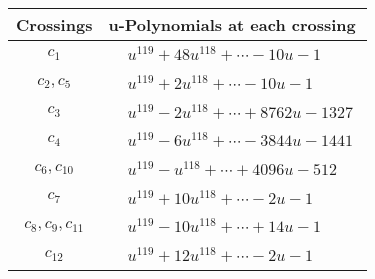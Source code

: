 \documentclass[1p]{elsarticle_modified}
\theoremstyle{definition}
\begin{document}
\begin{tabular}{m{50pt}|m{274pt}}
Crossings & \hspace{64pt}u-Polynomials at each crossing \\
\hline $$\begin{aligned}c_{1}\end{aligned}$$&$\begin{aligned}
&u^{119}+48 u^{118}+\cdots-10 u-1
\end{aligned}$\\
\hline $$\begin{aligned}c_{2},c_{5}\end{aligned}$$&$\begin{aligned}
&u^{119}+2 u^{118}+\cdots-10 u-1
\end{aligned}$\\
\hline $$\begin{aligned}c_{3}\end{aligned}$$&$\begin{aligned}
&u^{119}-2 u^{118}+\cdots+8762 u-1327
\end{aligned}$\\
\hline $$\begin{aligned}c_{4}\end{aligned}$$&$\begin{aligned}
&u^{119}-6 u^{118}+\cdots-3844 u-1441
\end{aligned}$\\
\hline $$\begin{aligned}c_{6},c_{10}\end{aligned}$$&$\begin{aligned}
&u^{119}- u^{118}+\cdots+4096 u-512
\end{aligned}$\\
\hline $$\begin{aligned}c_{7}\end{aligned}$$&$\begin{aligned}
&u^{119}+10 u^{118}+\cdots-2 u-1
\end{aligned}$\\
\hline $$\begin{aligned}c_{8},c_{9},c_{11}\end{aligned}$$&$\begin{aligned}
&u^{119}-10 u^{118}+\cdots+14 u-1
\end{aligned}$\\
\hline $$\begin{aligned}c_{12}\end{aligned}$$&$\begin{aligned}
&u^{119}+12 u^{118}+\cdots-2 u-1
\end{aligned}$\\
\hline
\end{tabular}\\~\\
\end{document}
